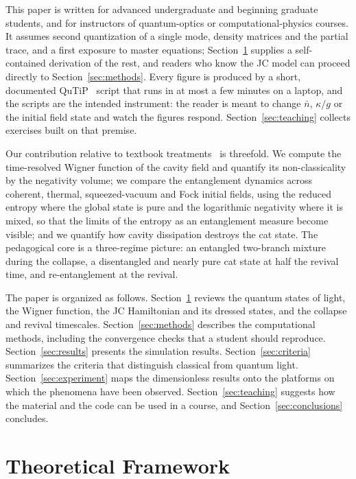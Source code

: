 \documentclass{iopjournal}
\begin{document}
This paper is written for advanced undergraduate and beginning graduate students, and for instructors of quantum-optics or computational-physics courses. It assumes second quantization of a single mode, density matrices and the partial trace, and a first exposure to master equations; Section~\ref{sec:theory} supplies a self-contained derivation of the rest, and readers who know the JC model can proceed directly to Section~\ref{sec:methods}. Every figure is produced by a short, documented QuTiP~\cite{johansson2012, johansson2013} script that runs in at most a few minutes on a laptop, and the scripts are the intended instrument: the reader is meant to change $\bar{n}$, $\kappa/g$ or the initial field state and watch the figures respond. Section~\ref{sec:teaching} collects exercises built on that premise.

Our contribution relative to textbook treatments~\cite{gerry2004, haroche2006} is threefold. We compute the time-resolved Wigner function of the cavity field and quantify its non-classicality by the negativity volume; we compare the entanglement dynamics across coherent, thermal, squeezed-vacuum and Fock initial fields, using the reduced entropy where the global state is pure and the logarithmic negativity where it is mixed, so that the limits of the entropy as an entanglement measure become visible; and we quantify how cavity dissipation destroys the cat state. The pedagogical core is a three-regime picture: an entangled two-branch mixture during the collapse, a disentangled and nearly pure cat state at half the revival time, and re-entanglement at the revival.

The paper is organized as follows. Section~\ref{sec:theory} reviews the quantum states of light, the Wigner function, the JC Hamiltonian and its dressed states, and the collapse and revival timescales. Section~\ref{sec:methods} describes the computational methods, including the convergence checks that a student should reproduce. Section~\ref{sec:results} presents the simulation results. Section~\ref{sec:criteria} summarizes the criteria that distinguish classical from quantum light. Section~\ref{sec:experiment} maps the dimensionless results onto the platforms on which the phenomena have been observed. Section~\ref{sec:teaching} suggests how the material and the code can be used in a course, and Section~\ref{sec:conclusions} concludes.


\section{Theoretical Framework}
\label{sec:theory}
\end{document}
